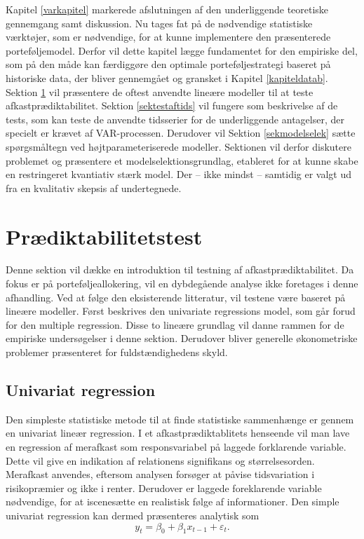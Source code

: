 \documentclass[
  a4paper,
  oneside]{memoir}
\begin{document}
Kapitel \ref{varkapitel} markerede afslutningen af den underliggende teoretiske gennemgang samt diskussion. Nu tages fat på de nødvendige statistiske værktøjer, som er nødvendige, for at kunne implementere den præsenterede porteføljemodel. Derfor vil dette kapitel lægge fundamentet for den empiriske del, som på den måde kan færdiggøre den optimale porteføljestrategi baseret på historiske data, der bliver gennemgået og gransket i Kapitel \ref{kapiteldatab}. Sektion \ref{sekpradik} vil præsentere de oftest anvendte lineære modeller til at teste afkastprædiktabilitet. Sektion \ref{sektestaftids} vil fungere som beskrivelse af de tests, som kan teste de anvendte tidsserier for de underliggende antagelser, der specielt er krævet af VAR-processen. Derudover vil Sektion \ref{sekmodelselek} sætte spørgsmåltegn ved højtparameteriserede modeller. Sektionen vil derfor diskutere problemet og præsentere et modelselektionsgrundlag, etableret for at kunne skabe en restringeret kvantiativ stærk model. Der -- ikke mindst -- samtidig er valgt ud fra en kvalitativ skepsis af undertegnede.

\hypertarget{sekpradik}{%
\section{Prædiktabilitetstest}\label{sekpradik}}

Denne sektion vil dække en introduktion til testning af afkastprædiktabilitet. Da fokus er på porteføljeallokering, vil en dybdegående analyse ikke foretages i denne afhandling. Ved at følge den eksisterende litteratur, vil testene være baseret på lineære modeller. Først beskrives den univariate regressions model, som går forud for den multiple regression. Disse to lineære grundlag vil danne rammen for de empiriske undersøgelser i denne sektion. Derudover bliver generelle økonometriske problemer præsenteret for fuldstændighedens skyld.

\hypertarget{univarregr}{%
\subsection{Univariat regression}\label{univarregr}}

Den simpleste statistiske metode til at finde statistiske sammenhænge er gennem en univariat lineær regression. I et afkastprædiktablitets henseende vil man lave en regression af merafkast som responsvariabel på laggede forklarende variable. Dette vil give en indikation af relationens signifikans og størrelsesorden. Merafkast anvendes, eftersom analysen forsøger at påvise tidsvariation i risikopræmier og ikke i renter. Derudover er laggede foreklarende variable nødvendige, for at iscenesætte en realistisk følge af informationer. Den simple univariat regression kan dermed præsenteres analytisk som
\[y_t=\beta_0 + \beta_1 x_{t-1} + \varepsilon_t.\]
\end{document}
